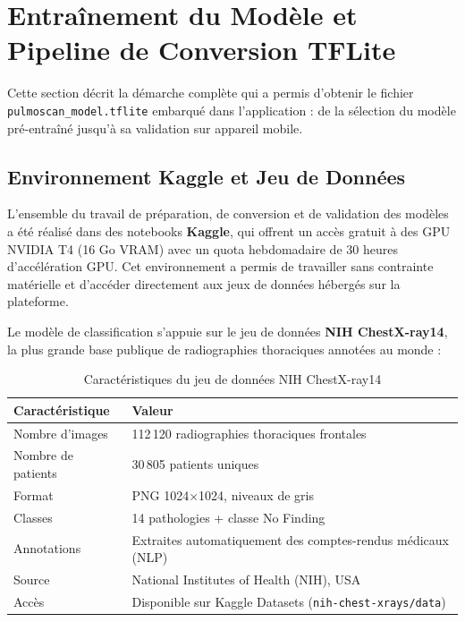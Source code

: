 \documentclass[12pt,a4paper]{report}
\begin{document}
\section{Entraînement du Modèle et Pipeline de Conversion TFLite}

Cette section décrit la démarche complète qui a permis d'obtenir le fichier
\texttt{pulmoscan\_model.tflite} embarqué dans l'application : de la sélection
du modèle pré-entraîné jusqu'à sa validation sur appareil mobile.

\subsection{Environnement Kaggle et Jeu de Données}

L'ensemble du travail de préparation, de conversion et de validation des modèles
a été réalisé dans des notebooks \textbf{Kaggle}, qui offrent un accès gratuit à
des GPU NVIDIA T4 (16 Go VRAM) avec un quota hebdomadaire de 30 heures
d'accélération GPU. Cet environnement a permis de travailler sans contrainte
matérielle et d'accéder directement aux jeux de données hébergés sur la
plateforme.

Le modèle de classification s'appuie sur le jeu de données
\textbf{NIH ChestX-ray14}, la plus grande base publique de radiographies
thoraciques annotées au monde :

\begin{table}[H]
\centering
\caption{Caractéristiques du jeu de données NIH ChestX-ray14}
\label{tab:nih}
\begin{tabularx}{\textwidth}{l X}
\toprule
\textbf{Caractéristique} & \textbf{Valeur} \\
\midrule
Nombre d'images & 112\,120 radiographies thoraciques frontales \\
Nombre de patients & 30\,805 patients uniques \\
Format & PNG 1024$\times$1024, niveaux de gris \\
Classes & 14 pathologies + classe \og{}No Finding\fg{} \\
Annotations & Extraites automatiquement des comptes-rendus médicaux (NLP) \\
Source & National Institutes of Health (NIH), USA \\
Accès & Disponible sur Kaggle Datasets (\texttt{nih-chest-xrays/data}) \\
\bottomrule
\end{tabularx}
\end{table}
\end{document}
